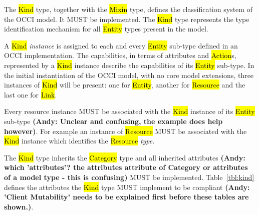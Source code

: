 \documentclass[10pt,a4paper]{article}
\begin{document}
The \hl{Kind} type, together with the \hl{Mixin} type, defines the
classification system of the OCCI model. It MUST be implemented. The \hl{Kind}
type represents the type identification mechanism for all \hl{Entity} types present in
the model.

A \hl{Kind} {\em instance} is assigned to each and every \hl{Entity} sub-type
defined in an OCCI implementation. The capabilities, in terms of attributes and
\hl{Action}s, represented by a \hl{Kind} instance describe the capabilities of
its \hl{Entity} sub-type.
%
In the initial instantiation of the OCCI model, with no core model extensions, three instances
of \hl{Kind} will be present: one for \hl{Entity}, another for \hl{Resource}
and the last one for \hl{Link}. 

Every resource instance MUST be associated with the \hl{Kind} instance of its
\hl{Entity} sub-type \textbf{(Andy: Unclear and confusing, the example does help however)}. 
For example an instance of \hl{Resource} MUST be
associated with the \hl{Kind} instance which identifies the \hl{Resource} {\em
type}.

The \hl{Kind} type inherits the \hl{Category} type and all inherited
attributes \textbf{(Andy: which 'attributes'? the attributes attribute of Category 
or attributes of a model type - this is confusing)} MUST be implemented. Table~\ref{tbl:kind} defines the
attributes the \hl{Kind} type MUST implement to be compliant 
\textbf{(Andy: 'Client Mutability' needs to be explained first before these tables are shown.)}.
\end{document}
